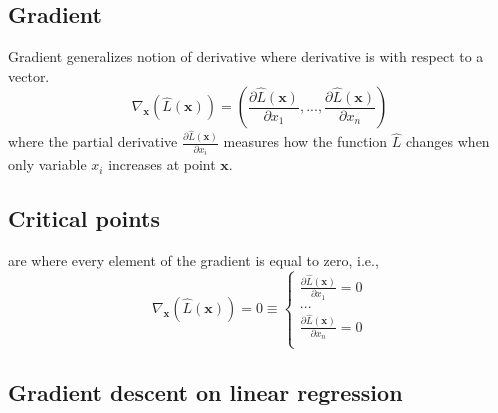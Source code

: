 \subsection*{Gradient}

Gradient generalizes notion of derivative where derivative is with respect to a vector. 
\begin{equation}
    \nabla_{\textbf{x}}(\hat{L}(\textbf{x})) = (\frac{{\partial \hat{L}(\textbf{x})}}{{\partial x_1}},...,\frac{{\partial \hat{L}(\textbf{x})}}{{\partial x_n}})
\end{equation}
where the partial derivative $\displaystyle \frac{{\partial \hat{L}(\textbf{x})}}{{\partial x_i}}$ measures how the function $\hat{L}$ changes when only variable $x_i$ increases at point $\textbf{x}$.  

\subsection*{Critical points}  are where every element of the gradient is equal to zero, i.e., 
\begin{equation}
    \nabla_{\textbf{x}}(\hat{L}(\textbf{x})) = 0 \equiv 
    \begin{cases}
    \displaystyle\frac{{\partial \hat{L}(\textbf{x})}}{{\partial x_1}} = 0 \\
    ... \\
    \displaystyle\frac{{\partial \hat{L}(\textbf{x})}}{{\partial x_n}} = 0\\
    \end{cases}
\end{equation}


\subsection*{Gradient descent on linear regression}

